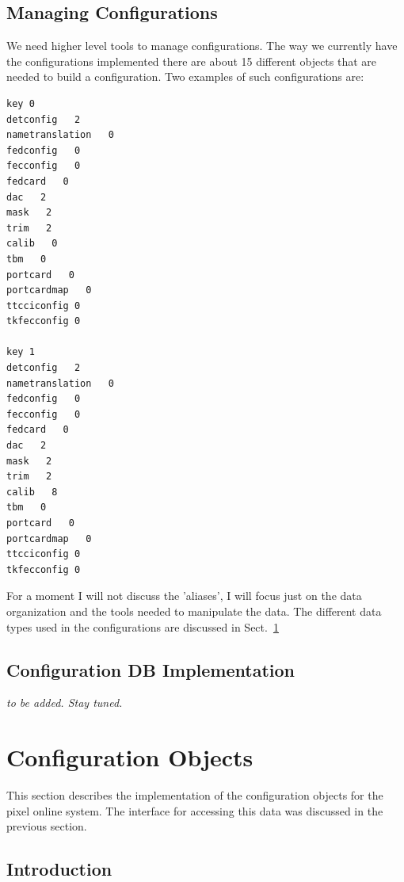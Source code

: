 \subsection{Managing Configurations}

We need higher level tools to manage configurations. The way we 
currently have the configurations implemented there are about 
15 different objects that are needed to build a configuration.
Two examples of such configurations are:

\begin{verbatim}
key 0
detconfig   2
nametranslation   0
fedconfig   0
fecconfig   0
fedcard   0
dac   2
mask   2
trim   2
calib   0
tbm   0
portcard   0
portcardmap   0
ttcciconfig 0
tkfecconfig 0

key 1
detconfig   2
nametranslation   0
fedconfig   0
fecconfig   0
fedcard   0
dac   2
mask   2
trim   2
calib   8
tbm   0
portcard   0
portcardmap   0
ttcciconfig 0
tkfecconfig 0
\end{verbatim}

For a moment I will not discuss the 'aliases', I will focus just
on the data organization and the tools needed to manipulate the
data. The different data types used in the configurations are 
discussed in Sect.~\ref{sect:configobjects}


\subsection{Configuration DB Implementation}

{\it to be added. Stay tuned.}


\section{Configuration Objects}
\label{sect:configobjects}

This section describes the implementation
of the configuration objects for the 
pixel online system. The interface for accessing this data 
was discussed in the previous section. 

\subsection{Introduction}

